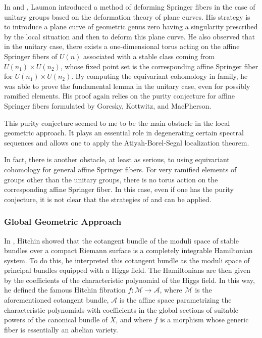 \documentclass[12pt,english]{smfart}
\numberwithin{equation}{subsection}
\theoremstyle{remark}
\newcommand\calA{{\mathscr A}}
\newcommand\calM{{\mathscr M}}
\begin{document}
In \cite{L} and \cite{L-LFU}, Laumon introduced a method of deforming Springer fibers in the case of unitary groups based on the deformation theory of plane curves. His strategy is to introduce a plane curve of geometric genus zero having a singularity prescribed by the local situation and then to deform this plane curve. He also observed that in the unitary case, there exists a one-dimensional torus acting on the affine Springer fibers of $U(n)$ associated with a stable class coming from $U(n_1)\times U(n_2)$, whose fixed point set is the corresponding affine Springer fiber for $U(n_1)\times U(n_2)$. By computing the equivariant cohomology in family, he was able to prove the fundamental lemma in the unitary case, even for possibly ramified elements. His proof again relies on the purity conjecture for affine Springer fibers formulated by Goresky, Kottwitz, and MacPherson.

This purity conjecture seemed to me to be the main obstacle in the local geometric approach. It plays an essential role in degenerating certain spectral sequences and allows one to apply the Atiyah-Borel-Segal localization theorem.

In fact, there is another obstacle, at least as serious, to using equivariant cohomology for general affine Springer fibers. For very ramified elements of groups other than the unitary groups, there is no torus action on the corresponding affine Springer fiber. In this case, even if one has the purity conjecture, it is not clear that the strategies of \cite{GKM} and \cite{L-LFU} can be applied.

\subsubsection*{Global Geometric Approach}
In \cite{H}, Hitchin showed that the cotangent bundle of the moduli space of stable bundles over a compact Riemann surface is a completely integrable Hamiltonian system. To do this, he interpreted this cotangent bundle as the moduli space of principal bundles equipped with a Higgs field. The Hamiltonians are then given by the coefficients of the characteristic polynomial of the Higgs field. In this way, he defined the famous Hitchin fibration $f:\calM\rightarrow\calA$, where $\calM$ is the aforementioned cotangent bundle, $\calA$ is the affine space parametrizing the characteristic polynomials with coefficients in the global sections of suitable powers of the canonical bundle of $X$, and where $f$ is a morphism whose generic fiber is essentially an abelian variety.
\end{document}
